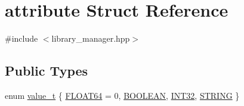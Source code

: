 \hypertarget{structattribute}{}\section{attribute Struct Reference}
\label{structattribute}


{\ttfamily \#include $<$library\+\_\+manager.\+hpp$>$}

\subsection*{Public Types}
\begin{DoxyCompactItemize}
\item 
enum \hyperlink{structattribute_a96d7b81ba16957b777d234cf215f004d}{value\+\_\+t} \{ \hyperlink{structattribute_a96d7b81ba16957b777d234cf215f004dadcd22770c2c0f0c58b30667ed8d81d73}{F\+L\+O\+A\+T64} = 0, 
\hyperlink{structattribute_a96d7b81ba16957b777d234cf215f004dab4d27d8e43170ae5dd573321600ec3a2}{B\+O\+O\+L\+E\+AN}, 
\hyperlink{structattribute_a96d7b81ba16957b777d234cf215f004daf24c451944038e9c929142875e29ac40}{I\+N\+T32}, 
\hyperlink{structattribute_a96d7b81ba16957b777d234cf215f004da16f07c1bd27e75db7487043af09dca8a}{S\+T\+R\+I\+NG}
 \}
\end{DoxyCompactItemize}
